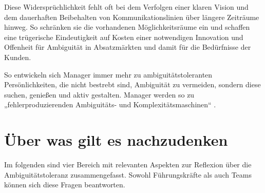 \documentclass[
  ngerman,
  letterpaper,
  DIV=11]{scrartcl}
\begin{document}
Diese Widersprüchlichkeit fehlt oft bei dem Verfolgen einer klaren
Vision und dem dauerhaften Beibehalten von Kommunikationslinien über
längere Zeiträume hinweg. So schränken sie die vorhandenen
Möglichkeitsräume ein und schaffen eine trügerische Eindeutigkeit auf
Kosten einer notwendigen Innovation und Offenheit für Ambiguität in
Absatzmärkten und damit für die Bedürfnisse der Kunden.

So entwickeln sich Manager immer mehr zu ambiguitätstoleranten
Persönlichkeiten, die nicht bestrebt sind, Ambiguität zu vermeiden,
sondern diese suchen, genießen und aktiv gestalten. Manager werden so zu
„fehlerproduzierenden Ambiguitäts- und Komplexitätsmaschinen``
\autocite{gutzmer2020}.

\section{Über was gilt es
nachzudenken}\label{uxfcber-was-gilt-es-nachzudenken}

Im folgenden sind vier Bereich mit relevanten Aspekten zur Reflexion
über die Ambiguitätstoleranz zusammengefasst. Sowohl Führungskräfte als
auch Teams können sich diese Fragen beantworten.
\end{document}
